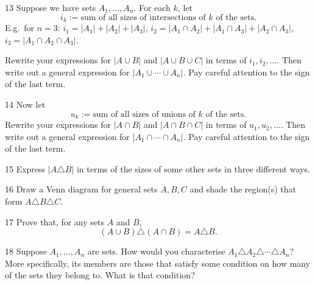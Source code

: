 \begin{exercise}{13}
    Suppose we have sets $A_1,\dots,A_n$. For each $k$, let
    \[
        i_k := \text{sum of all sizes of intersections of $k$ of the sets.}
    \]
    E.g.\ for $n=3$: $i_1=|A_1|+|A_2|+|A_3|$,
    $i_2=|A_1\cap A_2|+|A_1\cap A_3|+|A_2\cap A_3|$, $i_3=|A_1\cap A_2\cap A_3|$.

    Rewrite your expressions for $|A\cup B|$ and $|A\cup B\cup C|$ in terms of
    $i_1,i_2,\dots$. Then write out a general expression for
    $|A_1\cup\cdots\cup A_n|$. Pay careful attention to the sign of the last term.
\end{exercise}

\begin{exercise}{14}
    Now let
    \[
        u_k := \text{sum of all sizes of unions of $k$ of the sets.}
    \]
    Rewrite your expressions for $|A\cap B|$ and $|A\cap B\cap C|$ in terms of
    $u_1,u_2,\dots$. Then write out a general expression for
    $|A_1\cap\cdots\cap A_n|$. Pay careful attention to the sign of the last term.
\end{exercise}

\begin{exercise}{15}
    Express $|A\triangle B|$ in terms of the sizes of some other sets in three
    different ways.
\end{exercise}

\begin{exercise}{16}
    Draw a Venn diagram for general sets $A,B,C$ and shade the region(s) that
    form $A\triangle B\triangle C$.
\end{exercise}

\begin{exercise}{17}
    Prove that, for any sets $A$ and $B$,
    \[
        (A\cup B)\triangle(A\cap B) = A\triangle B.
    \]
\end{exercise}

\begin{exercise}{18}
    Suppose $A_1,\dots,A_n$ are sets. How would you characterise
    $A_1\triangle A_2\triangle\cdots\triangle A_n$? More specifically, its members
    are those that satisfy some condition on how many of the sets they belong to.
    What is that condition?
\end{exercise}

